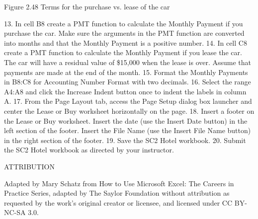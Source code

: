 Figure 2.48 Terms for the purchase vs. lease of the car


13. In cell B8 create a PMT function to calculate the Monthly Payment if you purchase the car.
Make sure the arguments in the PMT function are converted into months and that the Monthly
Payment is a positive number.
14. In cell C8 create a PMT function to calculate the Monthly Payment if you lease the car. The car
will have a residual value of \$15,000 when the lease is over. Assume that payments are made at
the end of the month.
15. Format the Monthly Payments in B8:C8 for Accounting Number Format with two decimals.
16. Select the range A4:A8 and click the Increase Indent button once to indent the labels in column
A.
17. From the Page Layout tab, access the Page Setup dialog box launcher and center the Lease or
Buy worksheet horizontally on the page.
18. Insert a footer on the Lease or Buy worksheet. Insert the date (use the Insert Date button) in the
left section of the footer. Insert the File Name (use the Insert File Name button) in the right
section of the footer.
19. Save the SC2 Hotel workbook.
20. Submit the SC2 Hotel workbook as directed by your instructor.

ATTRIBUTION

Adapted by Mary Schatz from How to Use Microsoft Excel: The Careers in Practice Series, adapted
by The Saylor Foundation without attribution as requested by the work’s original creator or
licensee, and licensed under CC BY-NC-SA 3.0.

